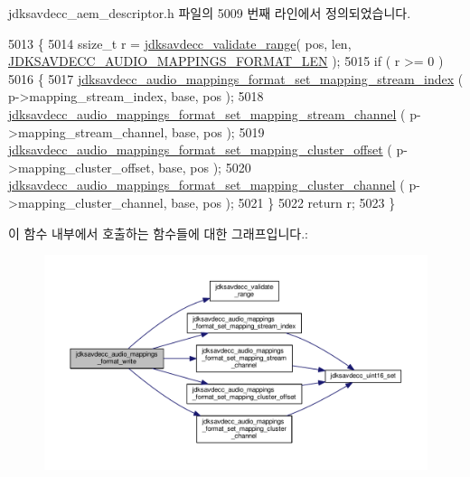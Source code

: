 jdksavdecc\+\_\+aem\+\_\+descriptor.\+h 파일의 5009 번째 라인에서 정의되었습니다.


\begin{DoxyCode}
5013 \{
5014     ssize\_t r = \hyperlink{group__util_ga9c02bdfe76c69163647c3196db7a73a1}{jdksavdecc\_validate\_range}( pos, len, 
      \hyperlink{group__audio__mappings__format_ga27e53ab74d41b53c675374da298eafc5}{JDKSAVDECC\_AUDIO\_MAPPINGS\_FORMAT\_LEN} );
5015     \textcolor{keywordflow}{if} ( r >= 0 )
5016     \{
5017         \hyperlink{group__audio__mappings__format_ga864035f94eddc1d440f7368137b91f77}{jdksavdecc\_audio\_mappings\_format\_set\_mapping\_stream\_index}
      ( p->mapping\_stream\_index, base, pos );
5018         \hyperlink{group__audio__mappings__format_gaa09d29b30a940b550b8ca33f33ec185f}{jdksavdecc\_audio\_mappings\_format\_set\_mapping\_stream\_channel}
      ( p->mapping\_stream\_channel, base, pos );
5019         \hyperlink{group__audio__mappings__format_ga38bb886da4eb67ab05ba5b20c5c5a1fb}{jdksavdecc\_audio\_mappings\_format\_set\_mapping\_cluster\_offset}
      ( p->mapping\_cluster\_offset, base, pos );
5020         \hyperlink{group__audio__mappings__format_ga777e2ccdef88d311abffb4ccd193b34c}{jdksavdecc\_audio\_mappings\_format\_set\_mapping\_cluster\_channel}
      ( p->mapping\_cluster\_channel, base, pos );
5021     \}
5022     \textcolor{keywordflow}{return} r;
5023 \}
\end{DoxyCode}


이 함수 내부에서 호출하는 함수들에 대한 그래프입니다.\+:
\nopagebreak
\begin{figure}[H]
\begin{center}
\leavevmode
\includegraphics[width=350pt]{group__audio__mappings__format_gad165b473114477342d2a15c874770513_cgraph}
\end{center}
\end{figure}



